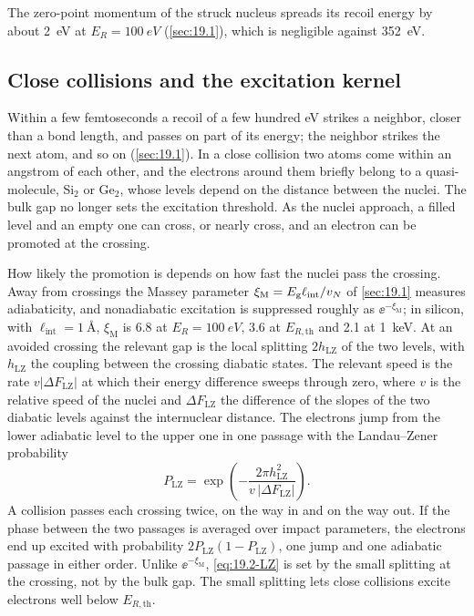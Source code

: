 The zero-point momentum of the struck nucleus spreads its recoil energy by about \SI{2}{eV} at $E_R = \SI{100}{eV}$ (\cref{sec:19.1}), which is negligible against \SI{352}{eV}.

\subsection{Close collisions and the excitation kernel}\label{sec:19.2-kernel}

Within a few femtoseconds a recoil of a few hundred eV strikes a neighbor, closer than a bond length, and passes on part of its energy; the neighbor strikes the next atom, and so on (\cref{sec:19.1}). In a close collision two atoms come within an angstrom of each other, and the electrons around them briefly belong to a quasi-molecule, Si$_2$ or Ge$_2$, whose levels depend on the distance between the nuclei. The bulk gap no longer sets the excitation threshold. As the nuclei approach, a filled level and an empty one can cross, or nearly cross, and an electron can be promoted at the crossing.

How likely the promotion is depends on how fast the nuclei pass the crossing. Away from crossings the Massey parameter $\xi_{\mathrm{M}} = E_{\mathrm{g}}\ell_{\mathrm{int}}/v_N$ of \cref{sec:19.1} measures adiabaticity, and nonadiabatic excitation is suppressed roughly as $\ee^{-\xi_{\mathrm{M}}}$; in silicon, with $\ell_{\mathrm{int}} = \SI{1}{\angstrom}$, $\xi_{\mathrm{M}}$ is 6.8 at $E_R = \SI{100}{eV}$, 3.6 at $E_{R,\mathrm{th}}$ and 2.1 at \SI{1}{keV}. At an avoided crossing the relevant gap is the local splitting $2h_{\mathrm{LZ}}$ of the two levels, with $h_{\mathrm{LZ}}$ the coupling between the crossing diabatic states. The relevant speed is the rate $v|\Delta F_{\mathrm{LZ}}|$ at which their energy difference sweeps through zero, where $v$ is the relative speed of the nuclei and $\Delta F_{\mathrm{LZ}}$ the difference of the slopes of the two diabatic levels against the internuclear distance. The electrons jump from the lower adiabatic level to the upper one in one passage with the Landau--Zener probability~\cite{zener1932non,vutha2010simple}
\begin{equation}
  P_{\mathrm{LZ}} = \exp\!\left(-\frac{2\pi h_{\mathrm{LZ}}^2}{v\,|\Delta F_{\mathrm{LZ}}|}\right) .
  \label{eq:19.2-LZ}
\end{equation}
A collision passes each crossing twice, on the way in and on the way out. If the phase between the two passages is averaged over impact parameters, the electrons end up excited with probability $2P_{\mathrm{LZ}}(1 - P_{\mathrm{LZ}})$, one jump and one adiabatic passage in either order. Unlike $\ee^{-\xi_{\mathrm{M}}}$, \cref{eq:19.2-LZ} is set by the small splitting at the crossing, not by the bulk gap. The small splitting lets close collisions excite electrons well below $E_{R,\mathrm{th}}$.

